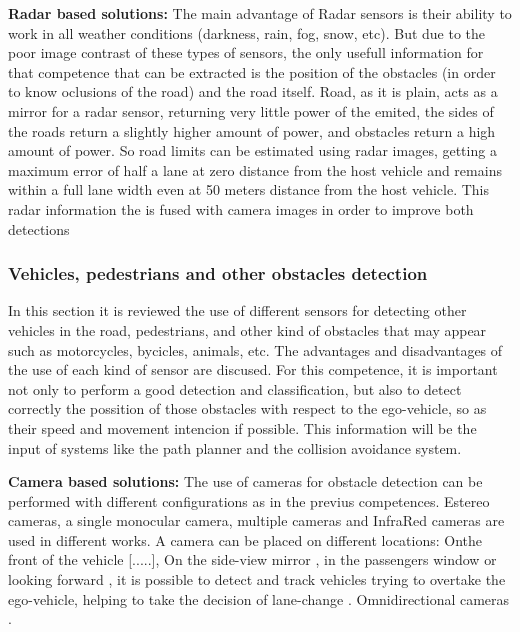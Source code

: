 \textbf{Radar based solutions:}
The main advantage of Radar sensors is their ability to work in all weather conditions (darkness, rain, fog, snow, etc). But due to the poor image contrast of these types of sensors, the only usefull information for that competence that can be extracted is the position of the obstacles (in order to know oclusions of the road) and the road itself. Road, as it is plain, acts as a mirror for a radar sensor, returning very little power of the emited, the sides of the roads return a slightly higher amount of power, and obstacles return a high amount of power. So road limits can be estimated using radar images, getting a maximum error of half a lane at zero distance from the host vehicle and remains within a full lane width even at 50 meters distance from the host vehicle. This radar information the is fused with camera images in order to improve both detections \cite{kaliyaperumal2001algorithm, ma2000simultaneous, Janda2013}

\subsubsection{Vehicles, pedestrians and other obstacles detection}
In this section it is reviewed the use of different sensors for detecting other vehicles in the road, pedestrians, and other kind of obstacles that may appear such as motorcycles, bycicles, animals, etc. The advantages and disadvantages of the use of each kind of sensor are discused. For this competence, it is important not only to perform a good detection and classification, but also to detect correctly the possition of those obstacles with respect to the ego-vehicle, so as their speed  and movement intencion if possible. This information will be the input of systems like the path planner and the collision avoidance system.


\textbf{Camera based solutions:}
The use of cameras for obstacle detection can be performed with different configurations as in the previus competences. Estereo cameras, a single monocular camera, multiple cameras and InfraRed cameras are used in different works.
A camera can be placed on different locations: Onthe front of the vehicle [.....], On the side-view mirror \cite{alonso2008lane, song2007lateral, blanc2007larasidecam} , in the passengers window \cite{chang2008real} or looking forward \cite{liu2007rear}, it is possible to detect and track vehicles trying to overtake the ego-vehicle, helping to take the decision of lane-change \cite{alonso2008lane, song2007lateral, blanc2007larasidecam}. Omnidirectional cameras \cite{gandhi2006vehicle}.


